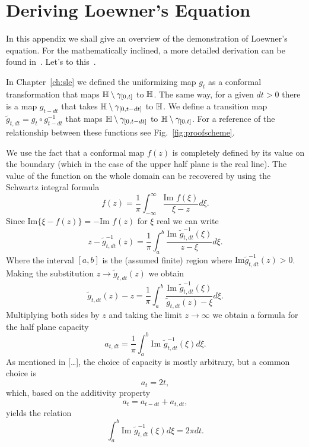 \chapter{Deriving Loewner's Equation}
\label{ch:proof}

In this appendix we shall give an overview of the demonstration of Loewner's
equation. For the mathematically inclined, a more detailed derivation can be
found in~\cite{delMonaco2013}. Let's to this~\cite{Kager2004}.

In Chapter~\ref{ch:sle} we defined the uniformizing map $g_t$ as a conformal
transformation that maps $\mathbb{H}\setminus\gamma_{[0,t]}$ to $\mathbb{H}$. The same way,
for a given $dt>0$ there is a map $g_{t-dt}$ that takes
$\mathbb{H}\setminus\gamma_{[0,t-dt]}$ to $\mathbb{H}$. We define a transition map
$\tilde{g}_{t,dt}=g_t\circ g_{t-dt}^{-1}$ that maps
$\mathbb{H}\setminus\gamma_{[0,t-dt]}$ to $\mathbb{H}\setminus\gamma_{[0,t]}$. For a
reference of the relationship between these functions see
Fig.~\ref{fig:proofscheme}.


We use the fact that a conformal map $f(z)$ is completely defined by its value
on the boundary (which in the case of the upper half plane is the real line).
The value of the function on the whole domain can be recovered by using the
Schwartz integral formula~\cite{Ahlfors1979}
\begin{equation}
    f\left(z\right)=
    \frac{1}{\pi}\int_{-\infty}^{\infty}
    \frac{\mbox{Im }f\left(\xi\right)}{\xi-z}d\xi.
\end{equation}
Since $\mbox{Im}\{\xi - f(z)\}=-\mbox{Im }f(z)$ for $\xi$ real we can write
\begin{equation}
    z-\tilde{g}_{t,dt}^{-1}\left(z\right)=
    \frac{1}{\pi}\int_{a}^{b}
    \frac{\mbox{Im }\tilde{g}_{t,dt}^{-1}\left(\xi\right)}{z-\xi}d\xi.
\end{equation}
Where the interval $[a,b]$ is the (assumed finite) region where $\mbox{Im
}\tilde{g}_{t,dt}^{-1}(z)>0$. Making the substitution
$z\rightarrow\tilde{g}_{t,dt}(z)$ we obtain
\begin{equation}
    \label{eq:proof1}
    \tilde{g}_{t,dt}\left(z\right)-z=
    \frac{1}{\pi}\int_{a}^{b}
    \frac{\mbox{Im }\tilde{g}_{t,dt}^{-1}\left(\xi\right)}
    {\tilde{g}_{t,dt}\left(z\right)-\xi}d\xi.
\end{equation}
Multiplying both sides by $z$ and taking the limit $z\rightarrow\infty$ we
obtain a formula for the half plane capacity
\begin{equation}
    a_{t,dt}=\frac{1}{\pi}\int_{a}^{b}
    \mbox{Im }\tilde{g}_{t,dt}^{-1}\left(\xi\right)d\xi.
\end{equation}
As mentioned in [\ldots], the choice of capacity is mostly arbitrary, but a
common choice is
\begin{equation}
    a_t = 2t,
\end{equation}
which, based on the additivity property
\begin{equation}
    a_t = a_{t-dt} + a_{t,dt},
\end{equation}
yields the relation
\begin{equation}
    \label{eq:proof2}
    \int_{a}^{b}\mbox{Im }\tilde{g}_{t,dt}^{-1}\left(\xi\right)d\xi=2\pi dt.
\end{equation}

